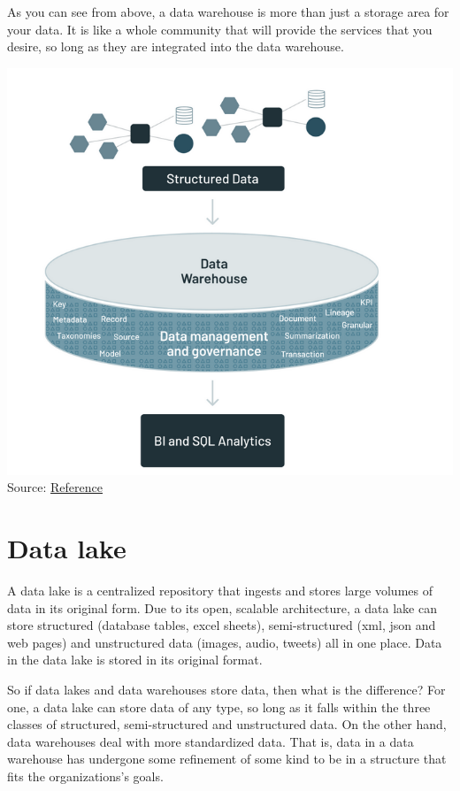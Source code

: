 \documentclass[
]{book}
\begin{document}
As you can see from above, a data warehouse is more than just a storage area for your data. It is like a whole community that will provide the services that you desire, so long as they are integrated into the data warehouse.

\includegraphics{./images/data_warehouse.png}
Source: \href{https://www.databricks.com/blog/2021/05/19/evolution-to-the-data-lakehouse.html}{Reference}

\hypertarget{data-lake}{%
\section{Data lake}\label{data-lake}}

A data lake is a centralized repository that ingests and stores large volumes of data in its original form. Due to its open, scalable architecture, a data lake can store structured (database tables, excel sheets), semi-structured (xml, json and web pages) and unstructured data (images, audio, tweets) all in one place. Data in the data lake is stored in its original format.

So if data lakes and data warehouses store data, then what is the difference? For one, a data lake can store data of any type, so long as it falls within the three classes of structured, semi-structured and unstructured data. On the other hand, data warehouses deal with more standardized data. That is, data in a data warehouse has undergone some refinement of some kind to be in a structure that fits the organizations's goals.
\end{document}
